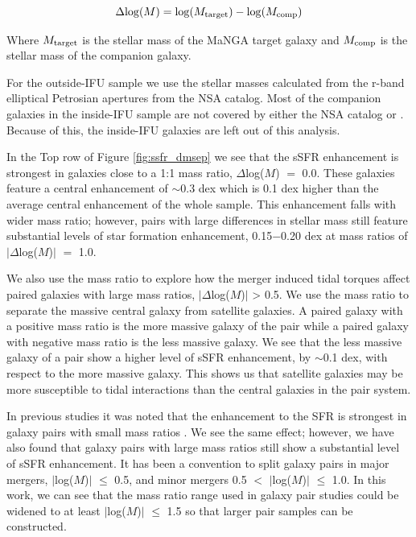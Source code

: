\documentclass[iop,revtex4,twocolumn,apj,numberedappendix,appendixfloats]{emulateapj}
\begin{document}
\begin{equation}
\Delta {\rm log}(M) = {\rm log}(M_{\rm target}) - {\rm log}(M_{\rm comp}) 
\end{equation}

Where $M_{\rm target}$ is the stellar mass of the MaNGA target galaxy and $M_{\rm comp}$ is the stellar mass of the companion galaxy. 

For the outside-IFU sample we use the stellar masses calculated from the r-band elliptical Petrosian apertures from the NSA catalog. Most of the companion galaxies in the inside-IFU sample are not covered by either the NSA catalog or \citet{Simard:2011}. Because of this, the inside-IFU galaxies are left out of this analysis.

In the Top row of Figure \ref{fig:ssfr_dmsep} we see that the sSFR enhancement is strongest in galaxies close to a 1:1 mass ratio, $\Delta$log($M$) $=$ 0.0. These galaxies feature a central enhancement of $\sim$0.3 dex which is 0.1 dex higher than the average central enhancement of the whole sample. This enhancement falls with wider mass ratio; however, pairs with large differences in stellar mass still feature substantial levels of star formation enhancement, 0.15$-$0.20 dex at mass ratios of $|\Delta$log($M$)$|$ $=$ 1.0.

We also use the mass ratio to explore how the merger induced tidal torques affect paired galaxies with large mass ratios, $|\Delta$log($M$)$|$ > 0.5. We use the mass ratio to separate the massive central galaxy from satellite galaxies. A paired galaxy with a positive mass ratio is the more massive galaxy of the pair while a paired galaxy with negative mass ratio is the less massive galaxy. We see that the less massive galaxy of a pair show a higher level of sSFR enhancement, by $\sim$0.1 dex, with respect to the more massive galaxy. This shows us that satellite galaxies may be more susceptible to tidal interactions than the central galaxies in the pair system. 

In previous studies it was noted that the enhancement to the SFR is strongest in galaxy pairs with small mass ratios \citet{Ellison:2008}. We see the same effect; however, we have also found that galaxy pairs with large mass ratios still show a substantial level of sSFR enhancement. It has been a convention to split galaxy pairs in major mergers, $|$log($M$)$|$ $\le$ 0.5, and minor mergers 0.5 $<$ $|$log($M$)$|$ $\le$ 1.0. In this work, we can see that the mass ratio range used in galaxy pair studies could be widened to at least $|$log($M$)$|$ $\le$ 1.5 so that larger pair samples can be constructed.  
\end{document}

